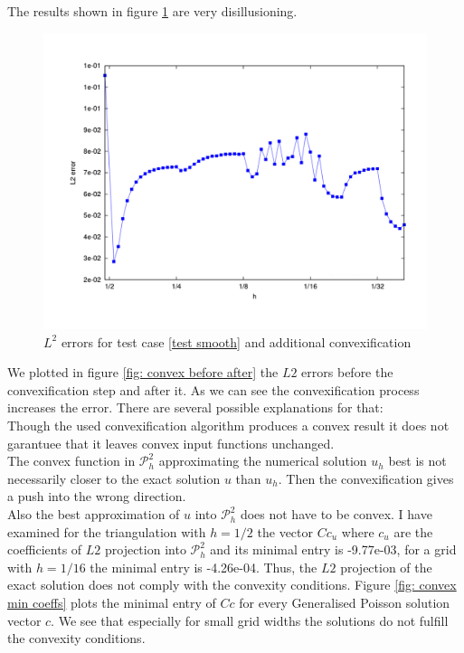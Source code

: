 The results shown in figure \ref{fig: l2 errors test smooth ourMethodConvex} are very disillusioning.
\begin{figure}[H]
\centering
	\includegraphics[scale =0.4]{plots/MA1_convexify.pdf}
	\caption{$L^2$ errors for test case \ref{test smooth} and additional convexification}
	\label{fig: l2 errors test smooth ourMethodConvex}
\end{figure}
We plotted in figure \ref{fig: convex before after} the $L2$ errors before the convexification step and after it. As we can see the convexification process increases the error. There are several possible explanations for that:\\
Though the used convexification algorithm produces a convex result it does not garantuee that it leaves convex input functions unchanged.\\
The convex function in $\mathcal P^2_h$ approximating the numerical solution $u_h$ best is not necessarily closer to the exact solution $u$ than $u_h$. Then the convexification gives a push into the wrong direction. \\
Also the best approximation of $u$ into $\mathcal P^2_h$ does not have to be convex. I have examined for the triangulation with $h=1/2$ the vector $Cc_u$ where $c_u$ are the coefficients of $L2$ projection into $\mathcal P^2_h$ and its minimal entry is -9.77e-03, for a grid with $h=1/16$ the minimal entry is -4.26e-04. Thus, the $L2$ projection of the exact solution does not comply with the convexity conditions.
Figure \ref{fig: convex min coeffs} plots the minimal entry of $Cc$ for every Generalised Poisson solution vector $c$. We see that especially for small grid widths the solutions do not fulfill the convexity conditions. 


